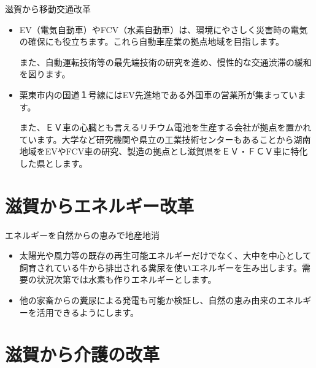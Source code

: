 \documentclass[dvipdfmx]{beamer}
\begin{document}
    \begin{frame}{滋賀から移動交通改革}{}
        \begin{small}
            \begin{itemize}
                \setlength{\parsep}{.5mm}
                \setlength{\itemsep}{2mm}
                \item EV（電気自動車）やFCV（水素自動車）は、環境にやさしく災害時の電気の確保にも役立ちます。これら自動車産業の拠点地域を目指します。\par
                また、自動運転技術等の最先端技術の研究を進め、慢性的な交通渋滞の緩和を図ります。
                \item 栗東市内の国道１号線にはEV先進地である外国車の営業所が集まっています。\par
                また、ＥＶ車の心臓とも言えるリチウム電池を生産する会社が拠点を置かれています。大学など研究機関や県立の工業技術センターもあることから湖南地域をEVやFCV車の研究、製造の拠点とし滋賀県をＥＶ・ＦＣＶ車に特化した県とします。
            \end{itemize}
        \end{small}
    \end{frame}

\section{滋賀からエネルギー改革}
    \begin{frame}{}{}
        \sectionpage
    \end{frame}

    \begin{frame}{エネルギーを自然からの恵みで地産地消}{}
        \begin{small}
            \begin{itemize}
                \setlength{\parsep}{.5mm}
                \setlength{\itemsep}{2mm}
                \item 太陽光や風力等の既存の再生可能エネルギーだけでなく、大中を中心として飼育されている牛から排出される糞尿を使いエネルギーを生み出します。需要の状況次第では水素も作りエネルギーとします。
                \item 他の家畜からの糞尿による発電も可能か検証し、自然の恵み由来のエネルギーを活用できるようにします。
            \end{itemize}
        \end{small}
    \end{frame}

\section{滋賀から介護の改革}
    \begin{frame}{}{}
        \sectionpage
    \end{frame}
\end{document}
